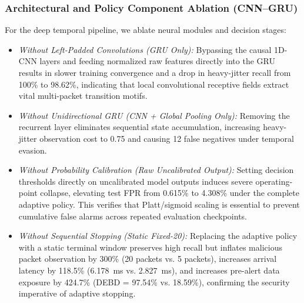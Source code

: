 \documentclass[conference]{IEEEtran}
\begin{document}
\subsubsection{Architectural and Policy Component Ablation (CNN--GRU)}
For the deep temporal pipeline, we ablate neural modules and decision stages:
\begin{itemize}
    \item \emph{Without Left-Padded Convolutions (GRU Only):} Bypassing the causal 1D-CNN layers and feeding normalized raw features directly into the GRU results in slower training convergence and a drop in heavy-jitter recall from 100\% to 98.62\%, indicating that local convolutional receptive fields extract vital multi-packet transition motifs.
    \item \emph{Without Unidirectional GRU (CNN + Global Pooling Only):} Removing the recurrent layer eliminates sequential state accumulation, increasing heavy-jitter observation cost to 0.75 and causing 12 false negatives under temporal evasion.
    \item \emph{Without Probability Calibration (Raw Uncalibrated Output):} Setting decision thresholds directly on uncalibrated model outputs induces severe operating-point collapse, elevating test FPR from 0.615\% to 4.308\% under the complete adaptive policy. This verifies that Platt/sigmoid scaling is essential to prevent cumulative false alarms across repeated evaluation checkpoints.
    \item \emph{Without Sequential Stopping (Static Fixed-20):} Replacing the adaptive policy with a static terminal window preserves high recall but inflates malicious packet observation by 300\% (20 packets vs. 5 packets), increases arrival latency by 118.5\% (6.178~ms vs. 2.827~ms), and increases pre-alert data exposure by 424.7\% (DEBD = 97.54\% vs. 18.59\%), confirming the security imperative of adaptive stopping.
\end{itemize}
\end{document}
